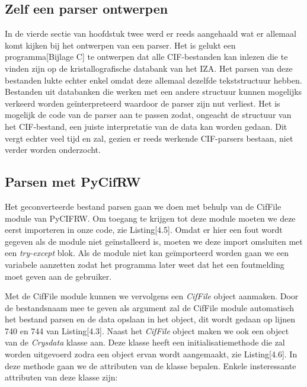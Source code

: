 \subsection{Zelf een parser ontwerpen}
In de vierde sectie van hoofdstuk twee werd er reeds aangehaald wat er allemaal komt kijken bij het ontwerpen van een parser. Het is gelukt een programma[Bijlage C] te ontwerpen dat alle CIF-bestanden kan inlezen die te vinden zijn op de kristallografische databank van het IZA.\citep*{IZA1} Het parsen van deze bestanden lukte echter enkel omdat deze allemaal dezelfde tekststructuur hebben. Bestanden uit databanken die werken met een andere structuur kunnen mogelijks verkeerd worden geïnterpreteerd waardoor de parser zijn nut verliest. Het is mogelijk de code van de parser aan te passen zodat, ongeacht de structuur van het CIF-bestand, een juiste interpretatie van de data kan worden gedaan. Dit vergt echter veel tijd en zal, gezien er reeds werkende CIF-parsers bestaan, niet verder worden onderzocht.



\subsection{Parsen met PyCifRW}
Het geconverteerde bestand parsen gaan we doen met behulp van de CifFile module van PyCIFRW. Om toegang te krijgen tot deze module moeten we deze eerst importeren in onze code, zie Listing[4.5]. Omdat er hier een fout wordt gegeven als de module niet geïnstalleerd is, moeten we deze import omsluiten met een \textit{try-except} blok. Als de module niet kan geïmporteerd worden gaan we een variabele aanzetten zodat het programma later weet dat het een foutmelding moet geven aan de gebruiker.



Met de CifFile module kunnen we vervolgens een \textit{CifFile} object aanmaken. Door de bestandsnaam mee te geven als argument zal de CifFile module automatisch het bestand parsen en de data opslaan in het object, dit wordt gedaan op lijnen 740 en 744 van Listing[4.3]. Naast het \textit{CifFile} object maken we ook een object van de \textit{Crysdata} klasse aan. Deze klasse heeft een initialisatiemethode die zal worden uitgevoerd zodra een object ervan wordt aangemaakt, zie Listing[4.6]. In deze methode gaan we de attributen van de klasse bepalen. Enkele insteressante attributen van deze klasse zijn:

